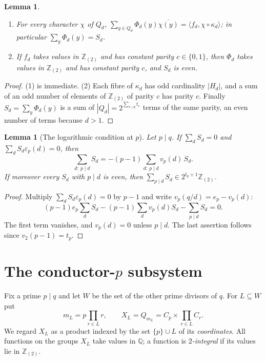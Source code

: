 \documentclass[11pt]{amsart}
\newtheorem{lemma}[theorem]{Lemma}
\theoremstyle{definition}
\theoremstyle{remark}
\providecommand{\Q}{\mathbb Q}
\newcommand{\Zt}{\mathbb Z_{(2)}}
\newcommand{\ip}[2]{\langle #1,#2\rangle}
\numberwithin{equation}{section}
\begin{document}
\begin{lemma}\label{lem:pushforward}
\begin{enumerate}
\item For every character $\chi$ of $Q_d$, $\sum_{y\in Q_d}\Phi_d(y)\overline{\chi(y)}=\ip{f_d}{\chi\circ\kappa_d}$; in particular $\sum_y\Phi_d(y)=S_d$.
\item If $f_d$ takes values in $\Zt$ and has constant parity $c\in\{0,1\}$, then $\Phi_d$ takes values in $\Zt$ and has constant parity $c$, and $S_d$ is even.
\end{enumerate}
\end{lemma}

\begin{proof}
(1) is immediate.
(2) Each fibre of $\kappa_d$ has odd cardinality $|H_d|$, and a sum of an odd number of elements of $\Zt$ of parity $c$ has parity $c$.
Finally $S_d=\sum_y\Phi_d(y)$ is a sum of $|Q_d|=2^{\sum_{r\mid d}t_r}$ terms of the same parity, an even number of terms because $d>1$.
\end{proof}

\begin{lemma}[The logarithmic condition at $p$]\label{lem:log}
Let $p\mid q$.
If $\sum_dS_d=0$ and $\sum_dS_d\varepsilon_p(d)=0$, then
\[
\sum_{d:\ p\mid d}S_d=-(p-1)\sum_{d:\ p\mid d}v_p(d)\,S_d .
\]
If moreover every $S_d$ with $p\mid d$ is even, then $\sum_{p\mid d}S_d\in2^{t_p+1}\Zt$.
\end{lemma}

\begin{proof}
Multiply $\sum_dS_d\varepsilon_p(d)=0$ by $p-1$ and write $v_p(q/d)=e_p-v_p(d)$:
\[
(p-1)e_p\sum_dS_d-(p-1)\sum_dv_p(d)S_d-\sum_{p\mid d}S_d=0 .
\]
The first term vanishes, and $v_p(d)=0$ unless $p\mid d$.
The last assertion follows since $v_2(p-1)=t_p$.
\end{proof}
\section{The conductor-\texorpdfstring{$p$}{p} subsystem}\label{sec:subsystem}

Fix a prime $p\mid q$ and let $W$ be the set of the other prime divisors of $q$.
For $L\subseteq W$ put
\[
m_L=p\prod_{r\in L}r,\qquad X_L=Q_{m_L}=C_p\times\prod_{r\in L}C_r .
\]
We regard $X_L$ as a product indexed by the set $\{p\}\cup L$ of its \emph{coordinates}.
All functions on the groups $X_L$ take values in $\Q$; a function is \emph{$2$-integral} if its values lie in $\Zt$.
\end{document}
